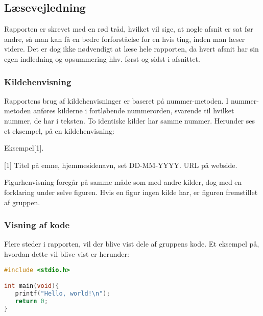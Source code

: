 \subsection{Læsevejledning}
Rapporten er skrevet med en rød tråd, hvilket vil sige, at nogle afsnit er sat før andre, så man kan få en bedre forforståelse for en hvis ting, inden man læser videre. Det er dog ikke nødvendigt at læse hele rapporten, da hvert afsnit har sin egen indledning og opsummering hhv. først og sidst i afsnittet.


\subsubsection{Kildehenvisning}
Rapportens brug af kildehenvisninger er baseret på nummer-metoden. I nummer-metoden anføres kilderne i fortløbende nummerorden, svarende til hvilket nummer, de har i teksten. To identiske kilder har samme nummer. Herunder ses et eksempel, på en kildehenvisning:

Eksempel[1].

[1] Titel på emne, hjemmesidenavn, set DD-MM-YYYY.
	URL på webside.

Figurhenvisning foregår på samme måde som med andre kilder, dog med en forklaring under selve figuren. Hvis en figur ingen kilde har, er figuren fremstillet af gruppen.


\subsubsection{Visning af kode}
Flere steder i rapporten, vil der blive vist dele af gruppens kode. Et eksempel på, hvordan dette vil blive vist er herunder:

\begin{lstlisting}[language=C, caption=Kodeeksempel i C]
#include <stdio.h>

int main(void){
   printf("Hello, world!\n");
   return 0;
}
\end{lstlisting}